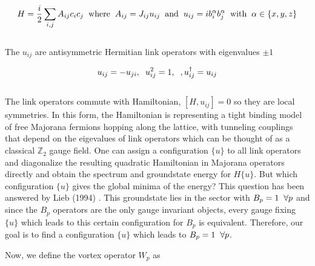 \documentclass{article}
\begin{document}
\begin{equation}\label{eq:24}
	\begin{aligned}
		H = \frac{i}{2} \sum_{i,j} A_{ij} c_i c_j \hspace{2mm}\text{where}\hspace{2mm} A_{ij} = J_{ij} u_{ij} \hspace{2mm}\text{and}\hspace{2mm} u_{ij} = i b^\alpha_i b^\alpha_j \hspace{2mm}\text{with}\hspace{2mm} \alpha\in \{x,y,z\}
	\end{aligned}
\end{equation}\\

The $u_{ij}$ are antisymmetric Hermitian link operators with eigenvalues $\pm 1$

\begin{equation}\label{eq:25}
	\begin{aligned}
		u_{ij} = -u_{ji}, \hspace{2mm} u^2_{ij} = 1, \hspace{2mm}, u^\dagger_{ij} = u_{ij}
	\end{aligned}
\end{equation}\\

The link operators commute with Hamiltonian, $[H, u_{ij}] = 0$ so they are local symmetries. In this form, the Hamiltonian is representing a tight binding model of free Majorana fermions hopping along the lattice, with tunneling couplings that depend on the eigevalues of link operators which can be thought of as a classical $\mathbb{Z}_2$ gauge field. One can assign a configuration $\{u\}$ to all link operators and diagonalize the resulting quadratic Hamiltonian in Majorana operators directly and obtain the spectrum and groundstate energy for $H\{u\}$. But which configuration $\{u\}$ gives the global minima of the energy? This question has been answered by Lieb (1994) \cite{kour2014real}. This groundstate lies in the sector with $B_p = 1 \hspace{2mm} \forall p$ and since the $B_p$ operators are the only gauge invariant objects, every gauge fixing $\{u\}$ which leads to this certain configuration for $B_p$ is equivalent. Therefore, our goal is to find a configuration $\{u\}$ which leads to $B_p = 1 \hspace{2mm} \forall p$. 

Now, we define the vortex operator $W_p$ as
\end{document}

